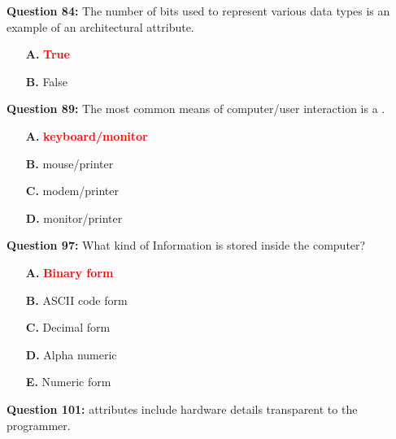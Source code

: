 \documentclass[12pt,a4paper]{article}
\begin{document}
\vspace{0.5cm}

\textbf{Question 84:} The number of bits used to represent various data types is an example of an architectural attribute.

\begin{itemize}
    \item[\textbf{A.}] \textcolor{red}{\textbf{True}}
    \item[\textbf{B.}] False
\end{itemize}

\vspace{0.5cm}

\vspace{0.5cm}

\textbf{Question 89:} The most common means of computer/user interaction is a \underline{\hspace{1.5cm}}.

\begin{itemize}
    \item[\textbf{A.}] \textcolor{red}{\textbf{keyboard/monitor}}
    \item[\textbf{B.}] mouse/printer
    \item[\textbf{C.}] modem/printer
    \item[\textbf{D.}] monitor/printer
\end{itemize}

\vspace{0.5cm}

\vspace{0.5cm}

\textbf{Question 97:} What kind of Information is stored inside the computer?

\begin{itemize}
    \item[\textbf{A.}] \textcolor{red}{\textbf{Binary form}}
    \item[\textbf{B.}] ASCII code form
    \item[\textbf{C.}] Decimal form
    \item[\textbf{D.}] Alpha numeric
    \item[\textbf{E.}] Numeric form
\end{itemize}

\vspace{0.5cm}

\vspace{0.5cm}

\textbf{Question 101:} \underline{\hspace{1.5cm}} attributes include hardware details transparent to the programmer.
\end{document}
